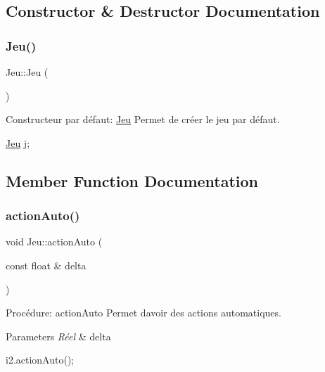 \subsection{Constructor \& Destructor Documentation}
\mbox{\label{classJeu_acc5795ee00edf75516d3dfe65be3e6d6}} 
\subsubsection{\texorpdfstring{Jeu()}{Jeu()}}
{\footnotesize\ttfamily Jeu\+::\+Jeu (\begin{DoxyParamCaption}{ }\end{DoxyParamCaption})}



Constructeur par défaut\+: \hyperlink{classJeu}{Jeu} Permet de créer le jeu par défaut. 


\begin{DoxyCode}
\hyperlink{classJeu}{Jeu} j;
\end{DoxyCode}
 

\subsection{Member Function Documentation}
\mbox{\label{classJeu_ad6c999b7a302fde5d2f32d88cbb8563c}} 
\subsubsection{\texorpdfstring{action\+Auto()}{actionAuto()}}
{\footnotesize\ttfamily void Jeu\+::action\+Auto (\begin{DoxyParamCaption}\item[{const float \&}]{delta }\end{DoxyParamCaption})}



Procédure\+: action\+Auto Permet d\textquotesingle{}avoir des actions automatiques. 


\begin{DoxyParams}{Parameters}
{\em Réel} & delta 
\begin{DoxyCode}
i2.actionAuto();
\end{DoxyCode}
 \\
\hline
\end{DoxyParams}
\mbox{\label{classJeu_a7528edef2101b0abda334ca1d78ea92e}} 
